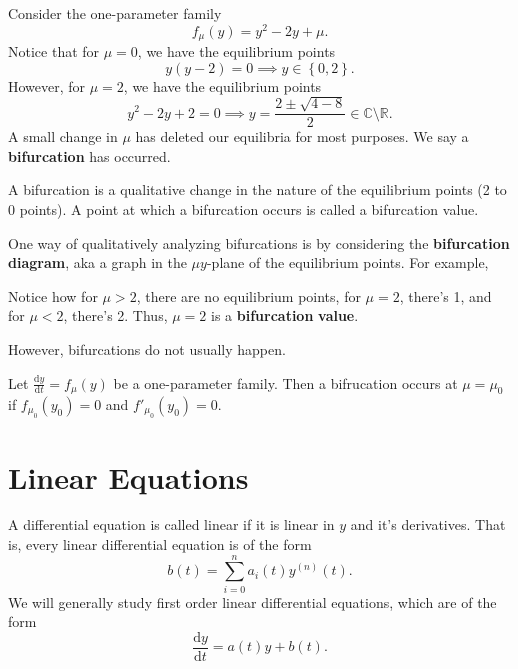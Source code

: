 Consider the one-parameter family
\[
	f_\mu (y)=y^2-2y+\mu 
.\]
Notice that for $\mu =0$, we have the equilibrium points
\[
	y(y-2)=0\implies y\in\left\{ 0,2 \right\} 
.\]
However, for $\mu =2$, we have the equilibrium points
\[
	y^2-2y+2=0 \implies y=\frac{2\pm \sqrt{4-8} }{2}\in \mathbb{C}\setminus\mathbb{R}
.\]
A small change in $\mu $ has deleted our equilibria for most purposes. We say a \textbf{bifurcation} has occurred.
\begin{definition}[Bifurcation]\label{dfn:7}
	A bifurcation is a qualitative change in the nature of the equilibrium points (2 to 0 points). A point at which a bifurcation occurs is called a bifurcation value.
\end{definition}

One way of qualitatively analyzing bifurcations is by considering the \textbf{bifurcation} \textbf{diagram}, aka a graph in the $\mu y$-plane of the equilibrium points. For example,
\begin{center}
\end{center}
Notice how for $\mu >2$, there are no equilibrium points, for $\mu =2$, there's 1, and for $\mu <2$, there's 2. Thus, $\mu =2$ is a \textbf{bifurcation} \textbf{value}.

However, bifurcations do not usually happen.
\begin{theorem}[Bifurcations]\label{thm:5}
	Let $\frac{\mathrm{d}y}{\mathrm{d}t} =f_\mu (y)$ be a one-parameter family. Then a bifrucation occurs  at $\mu =\mu _0$ if $f_{\mu _0}(y_0)=0$ and $f'_{\mu _0}(y_0)=0$.
\end{theorem}
\section{Linear Equations}
\begin{definition}\label{dfn:8}
	A differential equation is called linear if it is linear in $y$ and it's derivatives. That is, every linear differential equation is of the form
	\[
		b(t)=\sum_{i=0}^{n} a_i(t)y^{(n)}(t)
	.\]
	We will generally study first order linear differential equations, which are of the form
	\[
		\frac{\mathrm{d}y}{\mathrm{d}t} =a(t)y + b(t)
	.\]
\end{definition}

